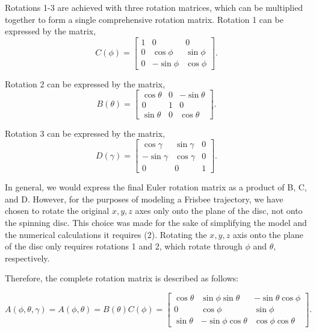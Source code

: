 \documentclass[a4paper,12pt, oneside]{article}
\begin{document}
Rotations 1-3 are achieved with three rotation matrices, which can be multiplied together to form a single comprehensive rotation matrix. Rotation 1 can be expressed by the matrix,
\begin{equation*}
C(\phi)=\begin{bmatrix}
1 & 0 & 0 \\
0 & \cos\phi & \sin\phi \\
0 & -\sin\phi & \cos\phi
\end{bmatrix}.
\end{equation*}

Rotation 2 can be expressed by the matrix, 
\begin{equation*}
B(\theta)=\begin{bmatrix}
\cos\theta & 0 & -\sin\theta \\
0 & 1 & 0 \\
\sin\theta & 0 & \cos\theta
\end{bmatrix}.
\end{equation*}

Rotation 3 can be expressed by the matrix, 
\begin{equation*}
D(\gamma)=\begin{bmatrix}
\cos\gamma & \sin\gamma & 0 \\
-\sin\gamma & \cos\gamma & 0 \\
0 & 0 & 1
\end{bmatrix}.
\end{equation*}

In general, we would express the final Euler rotation matrix as a product of B, C, and D. However, for the purposes of modeling a Frisbee trajectory, we have chosen to rotate the original $x, y, z$ axes only onto the plane of the disc, not onto the spinning disc. This choice was made for the sake of simplifying the model and the numerical calculations it requires (2). Rotating the $x, y, z$ axis onto the plane of the disc only requires rotations 1 and 2, which rotate through $\phi$ and $\theta$, respectively.

Therefore, the complete rotation matrix is described as follows:

\begin{equation*}
A(\phi,\theta,\gamma)=A(\phi,\theta)=B(\theta)C(\phi)=\begin{bmatrix}
\cos\theta & \sin\phi\sin\theta & -\sin\theta\cos\phi \\
0 & \cos\phi & \sin\phi \\
\sin\theta & -\sin\phi\cos\theta & \cos\phi\cos\theta
\end{bmatrix}.
\end{equation*}
\end{document}
